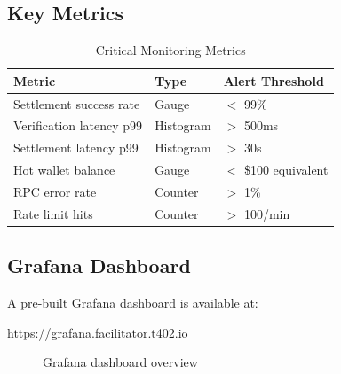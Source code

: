 \subsection{Key Metrics}

\begin{table}[htbp]
\centering
\caption{Critical Monitoring Metrics}
\label{tab:monitoring-metrics}
\footnotesize
\begin{tabular}{l l p{4.5cm}}
\toprule
\textbf{Metric} & \textbf{Type} & \textbf{Alert Threshold} \\
\midrule
Settlement success rate & Gauge & $<$ 99\% \\
Verification latency p99 & Histogram & $>$ 500ms \\
Settlement latency p99 & Histogram & $>$ 30s \\
Hot wallet balance & Gauge & $<$ \$100 equivalent \\
RPC error rate & Counter & $>$ 1\% \\
Rate limit hits & Counter & $>$ 100/min \\
\bottomrule
\end{tabular}
\end{table}

\subsection{Grafana Dashboard}

A pre-built Grafana dashboard is available at:

\begin{center}
\url{https://grafana.facilitator.t402.io}
\end{center}

\begin{figure}[htbp]
\centering
{}
\caption{Grafana dashboard overview}
\label{fig:grafana-dashboard}
\end{figure}

